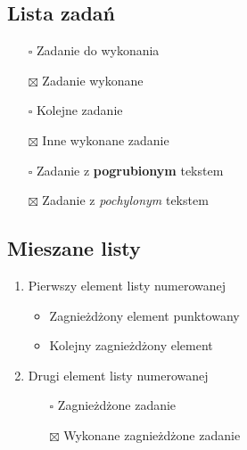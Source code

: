 \documentclass{article}
\begin{document}
\subsection{Lista zadań}



\begin{enumerate}
  \item[$\square$] Zadanie do wykonania

  \item[$\boxtimes$] Zadanie wykonane

  \item[$\square$] Kolejne zadanie

  \item[$\boxtimes$] Inne wykonane zadanie

  \item[$\square$] Zadanie z \textbf{pogrubionym} tekstem

  \item[$\boxtimes$] Zadanie z \textit{pochylonym} tekstem

\end{enumerate}



\subsection{Mieszane listy}



\begin{enumerate}
  \item Pierwszy element listy numerowanej
\begin{itemize}
  \item Zagnieżdżony element punktowany

  \item Kolejny zagnieżdżony element

\end{itemize}


  \item Drugi element listy numerowanej
\begin{enumerate}
  \item[$\square$] Zagnieżdżone zadanie

  \item[$\boxtimes$] Wykonane zagnieżdżone zadanie

\end{enumerate}


\end{enumerate}
\end{document}
